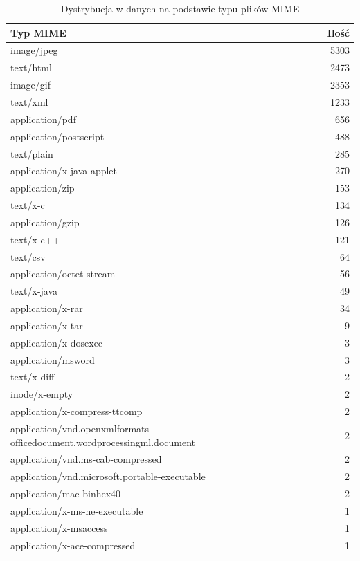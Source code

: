 \begin{table}[htbp]
    \centering
    \begin{tabular}{lr}
        \hline
        \textbf{Typ MIME} & \textbf{Ilość} \\
        \hline
        image/jpeg & 5303 \\
        text/html & 2473 \\
        image/gif & 2353 \\
        text/xml & 1233 \\
        application/pdf & 656 \\
        application/postscript & 488 \\
        text/plain & 285 \\
        application/x-java-applet & 270 \\
        application/zip & 153 \\
        text/x-c & 134 \\
        application/gzip & 126 \\
        text/x-c++ & 121 \\
        text/csv & 64 \\
        application/octet-stream & 56 \\
        text/x-java & 49 \\
        application/x-rar & 34 \\
        application/x-tar & 9 \\
        application/x-dosexec & 3 \\
        application/msword & 3 \\
        text/x-diff & 2 \\
        inode/x-empty & 2 \\
        application/x-compress-ttcomp & 2 \\
        application/vnd.openxmlformats-officedocument.wordprocessingml.document & 2 \\
        application/vnd.ms-cab-compressed & 2 \\
        application/vnd.microsoft.portable-executable & 2 \\
        application/mac-binhex40 & 2 \\
        application/x-ms-ne-executable & 1 \\
        application/x-msaccess & 1 \\
        application/x-ace-compressed & 1 \\
        \hline
    \end{tabular}
    \caption{Dystrybucja w danych na podstawie typu plików MIME}
    \label{tabela:typyMIMEdataset}
\end{table}



